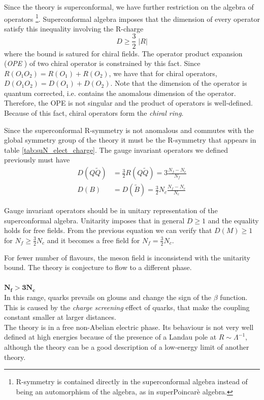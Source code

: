 Since the theory is superconformal, we have further restriction on the algebra of operators \footnote{
	R-symmetry is contained directly in the superconformal algebra instead of being an automorphism of the algebra, as in superPoincarè algebra.  
	}.
Superconformal algebra imposes that the dimension of every operator satisfy this inequality involving the R-charge
\begin{equation}
 D \geq \frac{3}{2} \; | R |
 \label{eqn:superconformal_dimension_rcharge}
\end{equation}
where the bound is satured for chiral fields.
The operator product expansion (\emph{OPE} ) of two chiral operator is constrained by this fact.
Since $R( O_1 O_2) = R(O_1) + R(O_2)$, we have that for chiral operators, $D(O_1 O_2) = D(O_1) + D(O_2)$. 
Note that the dimension of the operator is quantum corrected, i.e. contains the anomalous dimension of the operator.
Therefore, the OPE is not singular and the product of operators is well-defined. Because of this fact, chiral operators form the \emph{chiral ring}. 

Since the superconformal R-symmetry is not anomalous and commutes with the global symmetry group of the theory it must be the R-symmetry that appears in table \ref{tab:suN_elect_charge}.
The gauge invariant operators we defined previously must have
\begin{align}
 D(Q \tilde{Q}) &= \frac{3}{2} R(Q \tilde{Q}) = 3 \frac{N_f - N_c}{N_f}\\
 D(B) & = D(\tilde{B})  = \frac{3}{2} N_c \frac{N_f - N_c}{N_c}
\end{align}

Gauge invariant operators should be in unitary representation of the superconformal algebra.
Unitarity imposes that in general $D\geq 1$ and the equality holds for free fields.
From the previous equation we can verify that $D(M) \geq 1$ for $ N_f \geq \frac{3}{2}N_c$ and it becomes a free field for $N_f = \frac{3}{2}N_c$. 

For fewer number of flavours, the meson field is inconsistend with the unitarity bound.
The theory is conjecture to flow to a different phase.
\\
\\
$\mathbf{ N_f > 3 N_c}$\\
In this range, quarks prevails on glouns and change the sign of the $\beta$ function. 
This is caused by the \emph{charge screening} effect of quarks, that make the coupling constant smaller at larger distances.\\
The theory is in a free non-Abelian electric phase.
Its behaviour is not very well defined at high energies because of the presence of a Landau pole at $R \sim \Lambda^{-1}$, although the theory can be a good description of a low-energy limit of another theory. 

